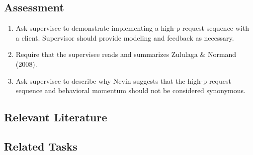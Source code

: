 \subsection{Assessment}
\begin{enumerate}
\item Ask supervisee to demonstrate implementing a high-p request sequence with a client.  Supervisor should provide modeling and feedback as necessary.
\item Require that the supervisee reads and summarizes Zululaga \& Normand (2008).
\item Ask supervisee to describe why Nevin suggests that the high-p request sequence and behavioral momentum should not be considered synonymous.
\end{enumerate}
%
\subsection{Relevant Literature}
\begin{refsection}
\nocite{test,alang2017police,clayton2018black}
\printbibliography[heading=none]
\end{refsection}
%
\subsection{Related Tasks}
\fourdOne{}\\
\fourdTwo{}\\
\foureOne{}\\
\foureTen{}\\
%
%
%
%
%
%
%
%
%
%
%
%
%
%
\section{\foureTen{}}
